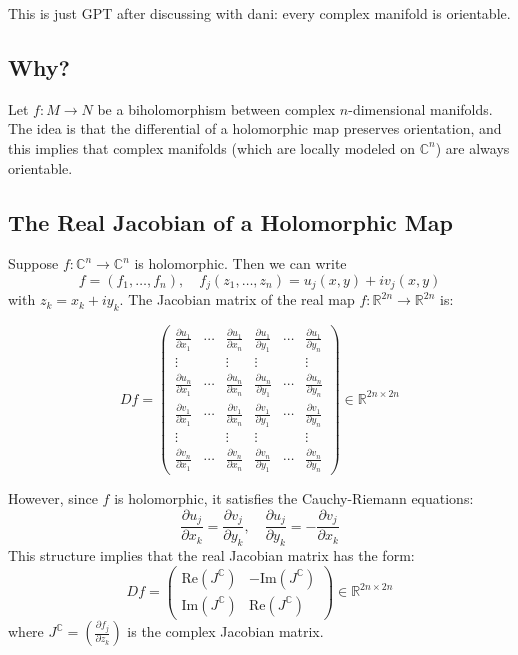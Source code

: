 This is just GPT after discussing with dani: every complex manifold is orientable.

\subsection*{Why?}

Let \( f: M \to N \) be a biholomorphism between complex \(n\)-dimensional manifolds. The idea is that the differential of a holomorphic map preserves orientation, and this implies that complex manifolds (which are locally modeled on \(\mathbb{C}^n\)) are always orientable.

\subsection*{The Real Jacobian of a Holomorphic Map}

Suppose \( f: \mathbb{C}^n \to \mathbb{C}^n \) is holomorphic. Then we can write
\[
f = (f_1, \dots, f_n), \quad f_j(z_1, \dots, z_n) = u_j(x, y) + i v_j(x, y)
\]
with \( z_k = x_k + i y_k \). The Jacobian matrix of the real map \( f: \mathbb{R}^{2n} \to \mathbb{R}^{2n} \) is:

\[
Df =
\begin{pmatrix}
\frac{\partial u_1}{\partial x_1} & \cdots & \frac{\partial u_1}{\partial x_n} & \frac{\partial u_1}{\partial y_1} & \cdots & \frac{\partial u_1}{\partial y_n} \\
\vdots & & \vdots & \vdots & & \vdots \\
\frac{\partial u_n}{\partial x_1} & \cdots & \frac{\partial u_n}{\partial x_n} & \frac{\partial u_n}{\partial y_1} & \cdots & \frac{\partial u_n}{\partial y_n} \\
\frac{\partial v_1}{\partial x_1} & \cdots & \frac{\partial v_1}{\partial x_n} & \frac{\partial v_1}{\partial y_1} & \cdots & \frac{\partial v_1}{\partial y_n} \\
\vdots & & \vdots & \vdots & & \vdots \\
\frac{\partial v_n}{\partial x_1} & \cdots & \frac{\partial v_n}{\partial x_n} & \frac{\partial v_n}{\partial y_1} & \cdots & \frac{\partial v_n}{\partial y_n}
\end{pmatrix}
\in \mathbb{R}^{2n \times 2n}
\]

However, since \(f\) is holomorphic, it satisfies the Cauchy-Riemann equations:
\[
\frac{\partial u_j}{\partial x_k} = \frac{\partial v_j}{\partial y_k}, \quad
\frac{\partial u_j}{\partial y_k} = -\frac{\partial v_j}{\partial x_k}
\]
This structure implies that the real Jacobian matrix has the form:
\[
Df = 
\begin{pmatrix}
\mathrm{Re}(J^{\mathbb{C}}) & -\mathrm{Im}(J^{\mathbb{C}}) \\
\mathrm{Im}(J^{\mathbb{C}}) & \mathrm{Re}(J^{\mathbb{C}})
\end{pmatrix}
\in \mathbb{R}^{2n \times 2n}
\]
where \( J^{\mathbb{C}} = \left( \frac{\partial f_j}{\partial z_k} \right) \) is the complex Jacobian matrix.

